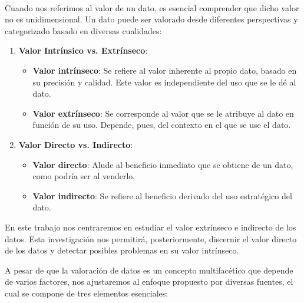 \

Cuando nos referimos al valor de un dato, es esencial
comprender que dicho valor no es unidimensional. Un dato
puede ser valorado desde diferentes perspectivas y
categorizado basado en diversas cualidades:

\begin{enumerate}
  \item \textbf{Valor Intrínsico vs. Extrínseco}:
  \begin{itemize}
    \item \textbf{Valor intrínseco}: Se refiere al valor
    inherente al propio dato, basado en su precisión y calidad.
    Este valor es independiente del uso que se le dé al dato.

    \item \textbf{Valor extrínseco}: Se corresponde al valor
    que se le atribuye al dato en función de su uso.
    Depende, pues, del contexto en el que se use el dato.
  \end{itemize}

  \item \textbf{Valor Directo vs. Indirecto}:
  \begin{itemize}
    \item \textbf{Valor directo}: Alude al beneficio
    inmediato que se obtiene de un dato, como podría ser
    al venderlo.

    \item \textbf{Valor indirecto}: Se refiere al
    beneficio derivado del uso estratégico del dato.
  \end{itemize}
\end{enumerate}

En este trabajo nos centraremos en estudiar el valor extrínseco
e indirecto de los datos. Esta investigación nos permitirá,
posteriormente, discernir el valor directo de los datos y
detectar posibles problemas en su valor intrínseco.

A pesar de que la valoración de datos es un concepto
multifacético que depende de varios factores, nos
ajustaremos al enfoque propuesto por diversas
fuentes\cite{dataShapley,betaShapley}, el cual se compone
de tres elementos esenciales:


